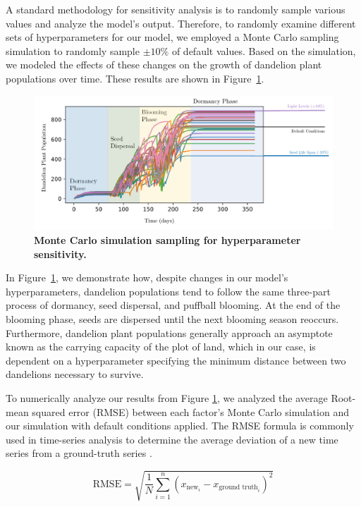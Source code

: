 A standard methodology for sensitivity analysis is to randomly sample various values and analyze the model's output. Therefore, to randomly examine different sets of hyperparameters for our model, we employed a Monte Carlo sampling simulation to randomly sample \(\pm 10\%\) of default values. Based on the simulation, we modeled the effects of these changes on the growth of dandelion plant populations over time. These results are shown in Figure~\ref{fig:sensitivitypopulation}.

\begin{figure}[h!]
\centering
    \includegraphics[scale=0.7]{figures/sensitivitypopulation.pdf}
    \captionsetup{width=0.9\textwidth}
    \caption{\textbf{Monte Carlo simulation sampling for hyperparameter sensitivity.}}
    \label{fig:sensitivitypopulation}
\end{figure}

In Figure~\ref{fig:sensitivitypopulation}, we demonstrate how, despite changes in our model's hyperparameters, dandelion populations tend to follow the same three-part process of dormancy, seed dispersal, and puffball blooming. At the end of the blooming phase, seeds are dispersed until the next blooming season reoccurs. Furthermore, dandelion plant populations generally approach an asymptote known as the carrying capacity of the plot of land, which in our case, is dependent on a hyperparameter specifying the minimum distance between two dandelions necessary to survive.

To numerically analyze our results from Figure \ref{fig:sensitivitypopulation}, we analyzed the average Root-mean squared error (RMSE) between each factor's Monte Carlo simulation and our simulation with default conditions applied. The RMSE formula is commonly used in time-series analysis to determine the average deviation of a new time series from a ground-truth series \cite{calzone_mae_2022}. 

\begin{equation}
    \text{RMSE} = \sqrt{\frac{1}{N}\sum\limits_{i=1}^{n} \left(x_{\text{new}_i} - x_{\text{ground truth}_i}\right)^2}
\end{equation}

